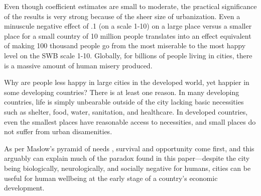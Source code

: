 \documentclass[11pt, letterpaper]{article}
\begin{document}
Even though coefficient estimates are small to moderate, the practical significance
of the results is very strong because of the sheer size of urbanization. 
%
Even a minuscule negative effect of .1 (on a scale 1-10) on a large place versus a smaller place for a small country of 10 million people translates into an effect equivalent of making 100 thousand people go from the most miserable to the most happy level on the SWB scale 1-10. %
 Globally, for billions of people living in cities, there is a massive amount of
 human misery produced. 

Why are people less happy in large cities in the developed world, yet happier in some
developing countries? There is at least one reason. In many developing
countries, life is simply unbearable outside of the city lacking basic
necessities such as shelter, food, water, sanitation, and healthcare. In
developed countries, even the smallest places have reasonable access to
necessities, and small places do not suffer from urban disamenities. %
 
As per Maslow's pyramid of needs \citep{maslow87}, survival and opportunity
come first, and this arguably can explain much of the paradox found in this
paper---despite the city being biologically, neurologically, and socially negative
for humans, cities can be useful for human wellbeing at the early stage of a
country's economic development. 


\end{document}
